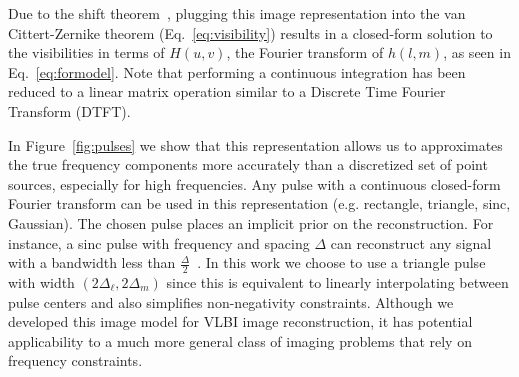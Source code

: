 {%
 
 Due to the shift theorem~\cite{oppenheim1997signals}, plugging this image representation into the van Cittert-Zernike theorem (Eq.~\ref{eq:visibility}) results in a closed-form solution to the visibilities in terms of $H(u,v)$, the Fourier transform of $h(l,m)$, as seen in Eq.~\ref{eq:formodel}. Note that performing a continuous integration has been reduced to a linear matrix operation similar to a Discrete Time Fourier Transform (DTFT). 
 
 
In Figure~\ref{fig:pulses} we show that this representation allows us to approximates the true frequency components more accurately than a discretized set of point sources, especially for high frequencies.  
Any pulse with a continuous closed-form Fourier transform can be used in this representation (e.g. rectangle, triangle, sinc, Gaussian). The chosen pulse places an implicit prior on the reconstruction. For instance, a sinc pulse with frequency and spacing $\Delta$ can reconstruct any signal with a bandwidth less than $\frac{\Delta}{2}$~\cite{oppenheim1997signals}. In this work we choose to use a triangle pulse with width $(2\Delta_\ell, 2\Delta_m)$ since this is equivalent to linearly interpolating between pulse centers and also simplifies 
non-negativity constraints. %
Although we developed this image model for VLBI image reconstruction, it has potential applicability to a much more general class of imaging problems that rely on frequency constraints.



}
